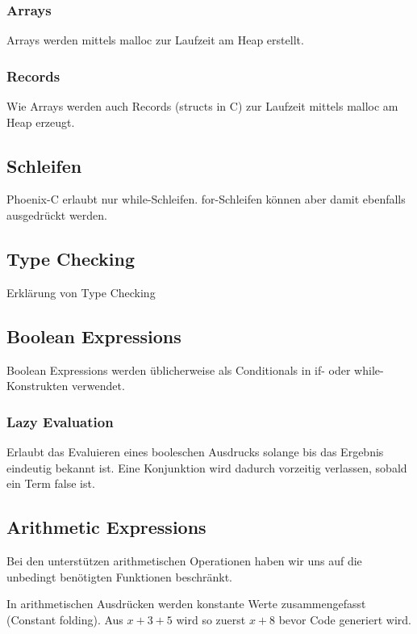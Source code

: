 \documentclass[a4paper]{article}
\begin{document}
	\subsubsection{Arrays}

	Arrays werden mittels malloc zur Laufzeit am Heap erstellt.

	\subsubsection{Records}

	Wie Arrays werden auch Records (structs in C) zur Laufzeit mittels malloc am Heap erzeugt.

	\subsection{Schleifen}

	Phoenix-C erlaubt nur while-Schleifen.
	for-Schleifen können aber damit ebenfalls ausgedrückt werden.

	\subsection{Type Checking}
	Erklärung von Type Checking

	\subsection{Boolean Expressions}

	Boolean Expressions werden üblicherweise als Conditionals in if- oder while-Konstrukten verwendet.

	\subsubsection{Lazy Evaluation}

	Erlaubt das Evaluieren eines booleschen Ausdrucks solange bis das Ergebnis eindeutig bekannt ist.
	Eine Konjunktion wird dadurch vorzeitig verlassen, sobald ein Term false ist.

	\subsection{Arithmetic Expressions}
	Bei den unterstützen arithmetischen Operationen haben wir uns auf die unbedingt benötigten Funktionen beschränkt.

	In arithmetischen Ausdrücken werden konstante Werte zusammengefasst (Constant folding).
	Aus $x + 3 + 5$ wird so zuerst $x+8$ bevor Code generiert wird.
\end{document}
